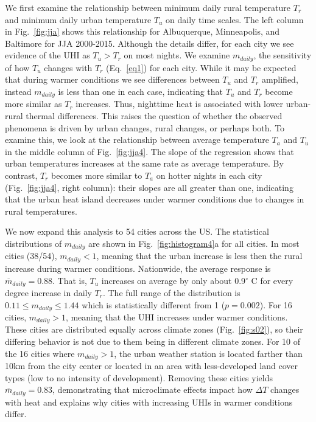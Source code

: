 {We first examine the relationship between minimum daily rural temperature $T_{r}$ and minimum daily urban temperature $T_u$ on daily time scales. The left column in Fig.~\ref{fig:jja} shows this relationship for Albuquerque, Minneapolis, and Baltimore for JJA 2000-2015. Although the details differ, for each city we see evidence of the UHI as $T_u > T_r$ on most nights. We examine $m_{daily}$, the sensitivity of how $T_u$ changes with $T_r$ (Eq.~\ref{eq1}) for each city. While it may be expected that during warmer conditions we see differences between $T_u$ and $T_r$ amplified, instead $m_{daily}$ is less than one in each case, indicating that $T_u$ and $T_r$ become more similar as $T_r$ increases. Thus, nighttime heat is associated with lower urban-rural thermal differences. 
This raises the question of whether the observed phenomena is driven by urban changes, rural changes, or perhaps both. To examine this, we look at the relationship between average temperature $T_{a}$ and $T_u$ in the middle column of Fig.~\ref{fig:jja4}. The slope of the regression shows that urban temperatures increases at the same rate as average temperature. By contrast, $T_r$ becomes more similar to $T_{a}$ on hotter nights in each city (Fig.~\ref{fig:jja4}, right column): their slopes are all greater than one, indicating that the urban heat island decreases under warmer conditions due to changes in rural temperatures.

We now expand this analysis to 54 cities across the US. The statistical distributions of $m_{daily}$ %
are shown in  Fig.~\ref{fig:histogram4}a for all cities. In most cities (38/54), $m_{daily}< 1$, meaning that the urban increase is less then the rural increase during warmer conditions.  Nationwide, the average response is $\overline{m}_{daily} = 0.88$. 
 That is, $T_u$ increases on average by only about 0.9$^\circ$ C for every degree increase in daily $T_r$. 
The full range of the distribution is $0.11 \leq m_{daily} \leq 1.44 $ which is statistically different from 1 ($p =0.002 $).
For 16 cities, $m_{daily} >1$, meaning that the UHI increases under warmer conditions. These cities are distributed equally across climate zones (Fig.~\ref{fig:s02}), so their differing behavior is not due to them being in different climate zones. 
For 10 of the 16 cities where $m_{daily} >1$, the urban weather station is located farther than 10km from the city center or located in an area with less-developed land cover types (low to no intensity of development). Removing these cities yields $\overline{m}_{daily} = 0.83$, demonstrating that microclimate effects impact how $\Delta T$ changes with heat and explains why cities with increasing UHIs in warmer conditions differ. 

}
